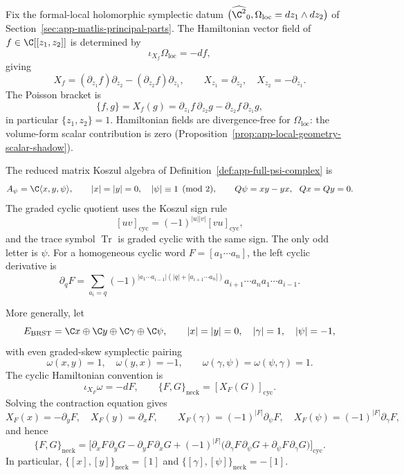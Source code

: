 \begin{defn}
\label{def:app-sign-hamiltonian-cyclic}
  Fix the formal-local holomorphic symplectic datum
  \(\bigl(\widehat{\C^2}_0,\Omega_{\mathrm{loc}}=dz_1\wedge dz_2\bigr)\)
  of Section~\ref{sec:app-matlis-principal-parts}.  The Hamiltonian
  vector field of \(f\in\C[[z_1,z_2]]\) is determined by
  \[
    \iota_{X_f}\Omega_{\mathrm{loc}}=-df,
  \]
  giving
  \[
    X_f=(\partial_{z_1}f)\partial_{z_2}
        -(\partial_{z_2}f)\partial_{z_1},
    \qquad
    X_{z_1}=\partial_{z_2},\quad X_{z_2}=-\partial_{z_1}.
  \]
  The Poisson bracket is
  \[
    \{f,g\}
      =X_f(g)
      =\partial_{z_1}f\,\partial_{z_2}g
      -\partial_{z_2}f\,\partial_{z_1}g,
  \]
  in particular \(\{z_1,z_2\}=1\).  Hamiltonian fields are
  divergence-free for \(\Omega_{\mathrm{loc}}\): the volume-form scalar
  contribution is zero
  (Proposition~\ref{prop:app-local-geometry-scalar-shadow}).

  The reduced matrix Koszul algebra of
  Definition~\ref{def:app-full-psi-complex} is
  \[
    A_\psi=\C\langle x,y,\psi\rangle,
    \qquad
    |x|=|y|=0,\quad |\psi|\equiv1\pmod 2,
    \qquad
    Q\psi=xy-yx,\ \ Qx=Qy=0.
  \]
  The graded cyclic quotient uses the Koszul sign rule
  \[
    [uv]_{\mathrm{cyc}}=(-1)^{|u||v|}[vu]_{\mathrm{cyc}},
  \]
  and the trace symbol \(\operatorname{Tr}\) is graded cyclic with the
  same sign.  The only odd letter is \(\psi\).  For a homogeneous cyclic
  word \(F=[a_1\cdots a_n]\), the left cyclic derivative is
  \[
    \partial_qF
      =\sum_{a_i=q}
       (-1)^{|a_1\cdots a_{i-1}|
                    (|q|+|a_{i+1}\cdots a_n|)}
       a_{i+1}\cdots a_na_1\cdots a_{i-1}.
  \]

  More generally, let
  \[
    E_{\mathrm{BRST}}
      =\C x\oplus\C y\oplus\C\gamma\oplus\C\psi,
    \qquad |x|=|y|=0,\quad |\gamma|=1,\quad |\psi|=-1,
  \]
  with even graded-skew symplectic pairing
  \[
    \omega(x,y)=1,\quad \omega(y,x)=-1,
    \qquad \omega(\gamma,\psi)=\omega(\psi,\gamma)=1.
  \]
  The cyclic Hamiltonian convention is
  \[
    \iota_{X_F}\omega=-dF,
    \qquad \{F,G\}_{\mathrm{neck}}=[X_F(G)]_{\mathrm{cyc}}.
  \]
  Solving the contraction equation gives
  \[
    X_F(x)=-\partial_yF,\quad X_F(y)=\partial_xF,
    \qquad
    X_F(\gamma)=(-1)^{|F|}\partial_\psi F,\quad
    X_F(\psi)=(-1)^{|F|}\partial_\gamma F,
  \]
  and hence
  \[
    \{F,G\}_{\mathrm{neck}}
      =\bigl[
        \partial_xF\,\partial_yG-\partial_yF\,\partial_xG
        +(-1)^{|F|}\bigl(
          \partial_\gamma F\,\partial_\psi G
          +\partial_\psi F\,\partial_\gamma G\bigr)
       \bigr]_{\mathrm{cyc}}.
  \]
  In particular,
  \(\{[x],[y]\}_{\mathrm{neck}}=[1]\) and
  \(\{[\gamma],[\psi]\}_{\mathrm{neck}}=-[1]\).
\end{defn}

